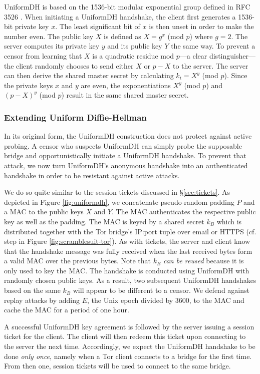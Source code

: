 \documentclass{sig-alternate}
\numberwithin{enumi}{section}
\numberwithin{notesctr}{section}
\begin{document}
UniformDH is based on the 1536-bit modular exponential group defined in RFC 3526 \cite{rfc3526}.
When initiating a UniformDH handshake, the client first generates a 1536-bit private key $x$. The
least significant bit of $x$ is then unset in order to make the number even. The public key $X$ is
defined as $X = g^{x}$ (mod $p$) where $g = 2$. The server computes its private key $y$ and its
public key $Y$ the same way. To prevent a censor from learning that $X$ is a quadratic residue mod
$p$---a clear distinguisher---the client randomly chooses to send either $X$ or $p - X$ to the
server. The server can then derive the shared master secret by calculating $k_{t} = X^y$ (mod $p$).
Since the private keys $x$ and $y$ are even, the exponentiations $X^y$ (mod $p$) and $(p - X)^y$
(mod $p$) result in the same shared master secret.

\subsubsection{Extending Uniform Diffie-Hellman}
In its original form, the UniformDH construction does not protect against active probing. A censor
who suspects UniformDH can simply probe the supposable bridge and opportunistically initiate a
UniformDH handshake. To prevent that attack, we now turn UniformDH's anonymous handshake into an
authenticated handshake in order to be resistant against active attacks.

We do so quite similar to the session tickets discussed in \S \ref{sec:tickets}. As depicted in
Figure \ref{fig:uniformdh}, we concatenate pseudo-random padding $P$ and a MAC to the public keys
$X$ and $Y$.  The MAC authenticates the respective public key as well as the padding. The MAC is
keyed by a shared secret $k_{B}$ which is distributed together with the Tor bridge's IP:port
tuple over email or HTTPS (cf. step  in Figure \ref{fig:scramblesuit-tor}). As with tickets, the
server and client know that the handshake message was fully received when the last received bytes
form a valid MAC over the previous bytes. Note that $k_{B}$ \emph{can be reused} because it is only
used to key the MAC. The handshake is conducted using UniformDH with randomly chosen public keys. As
a result, two subsequent UniformDH handshakes based on the same $k_{B}$ will appear to be different
to a censor. We defend against replay attacks by adding $E$, the Unix epoch divided by 3600, to the
MAC and cache the MAC for a period of one hour.

A successful UniformDH key agreement is followed by the server issuing a session ticket for the
client. The client will then redeem this ticket upon connecting to the server the next time.
Accordingly, we expect the UniformDH handshake to be done \emph{only once}, namely when a Tor client
connects to a bridge for the first time. From then one, session tickets will be used to connect to
the same bridge.
\end{document}
